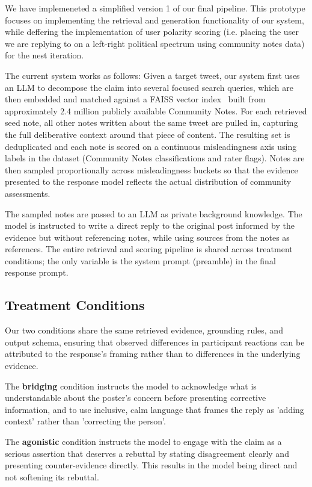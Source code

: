 \documentclass{article}
\begin{document}
We have implemeneted a simplified version 1 of our final pipeline. This prototype focuses on implementing the retrieval and generation functionality of our system, while deffering the implementation of user polarity scoring (i.e. placing the user we are replying to on a left-right political spectrum using community notes data) for the nest iteration.

The current system works as follows: Given a target tweet, our system first uses an LLM to decompose the claim into several focused search queries, which are then embedded and matched against a FAISS vector index~\cite{Johnson2019FAISS} built from approximately 2.4 million publicly available Community Notes. For each retrieved seed note, all other notes written about the same tweet are pulled in, capturing the full deliberative context around that piece of content. The resulting set is deduplicated and each note is scored on a continuous misleadingness axis using labels in the dataset (Community Notes classifications and rater flags). Notes are then sampled proportionally across misleadingness buckets so that the evidence presented to the response model reflects the actual distribution of community assessments.

The sampled notes are passed to an LLM as private background knowledge. The model is instructed to write a direct reply to the original post informed by the evidence but without referencing notes, while using sources from the notes as references. The entire retrieval and scoring pipeline is shared across treatment conditions; the only variable is the system prompt (preamble) in the final response prompt.

\subsection{Treatment Conditions}\label{sec:condition_impl}

Our two conditions share the same retrieved evidence, grounding rules, and output schema, ensuring that observed differences in participant reactions can be attributed to the response's framing rather than to differences in the underlying evidence.

The \textbf{bridging} condition instructs the model to acknowledge what is understandable about the poster's concern before presenting corrective information, and to use inclusive, calm language that frames the reply as 'adding context' rather than 'correcting the person'.

The \textbf{agonistic} condition instructs the model to engage with the claim as a serious assertion that deserves a rebuttal by stating disagreement clearly and presenting counter-evidence directly. This results in the model being direct and not softening its rebuttal.
\end{document}
